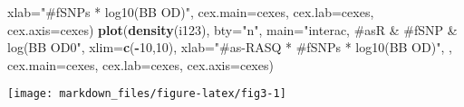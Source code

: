 \documentclass[]{article}
\newenvironment{Shaded}{\begin{snugshade}}{\end{snugshade}}
\newcommand{\KeywordTok}[1]{\textcolor[rgb]{0.13,0.29,0.53}{\textbf{#1}}}
\newcommand{\DataTypeTok}[1]{\textcolor[rgb]{0.13,0.29,0.53}{#1}}
\newcommand{\DecValTok}[1]{\textcolor[rgb]{0.00,0.00,0.81}{#1}}
\newcommand{\StringTok}[1]{\textcolor[rgb]{0.31,0.60,0.02}{#1}}
\newcommand{\OperatorTok}[1]{\textcolor[rgb]{0.81,0.36,0.00}{\textbf{#1}}}
\newcommand{\NormalTok}[1]{#1}
\begin{document}
\begin{Shaded}
\begin{Highlighting}[]
     \DataTypeTok{xlab=}\StringTok{"#fSNPs * log10(BB OD)"}\NormalTok{, }\DataTypeTok{cex.main=}\NormalTok{cexes, }\DataTypeTok{cex.lab=}\NormalTok{cexes, }\DataTypeTok{cex.axis=}\NormalTok{cexes)}
\KeywordTok{plot}\NormalTok{(}\KeywordTok{density}\NormalTok{(i123), }\DataTypeTok{bty=}\StringTok{"n"}\NormalTok{, }\DataTypeTok{main=}\StringTok{"interac, #asR & #fSNP & log(BB OD0"}\NormalTok{, }\DataTypeTok{xlim=}\KeywordTok{c}\NormalTok{(}\OperatorTok{-}\DecValTok{10}\NormalTok{,}\DecValTok{10}\NormalTok{),}
     \DataTypeTok{xlab=}\StringTok{"#as-RASQ * #fSNPs * log10(BB OD)"}\NormalTok{, , }\DataTypeTok{cex.main=}\NormalTok{cexes, }\DataTypeTok{cex.lab=}\NormalTok{cexes, }\DataTypeTok{cex.axis=}\NormalTok{cexes)}
\end{Highlighting}
\end{Shaded}

\begin{center}\texttt{[image: markdown\_files/figure-latex/fig3-1]} \end{center}
\end{document}
